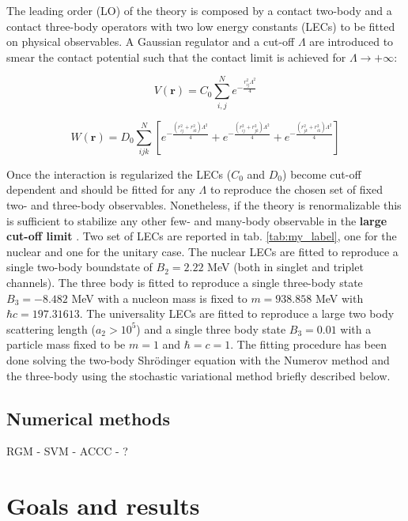 \documentclass[aps,onecolumn,preprintnumbers,amsmath,amssymb,nofootinbib,superscriptaddress,notitlepage]{revtex4-1}
\begin{document}
The leading order (LO) of the theory is composed by a contact two-body and a contact three-body operators with two low energy constants (LECs) to be fitted on physical observables. 
A Gaussian regulator and a cut-off $\Lambda$ are introduced to smear the contact potential such that the contact limit is achieved for $\Lambda\rightarrow+\infty$: 

\begin{equation}
    V(\textbf{r})=C_0 \sum_{i,j}^N e^{-\frac{r_{ij}^2\Lambda^2}{4}}
\end{equation}

\begin{equation}
    W(\textbf{r})=D_0 \sum_{ijk}^N \left[
    e^{-\frac{(r_{ij}^2+r_{ik}^2)\Lambda^2}{4}}+
    e^{-\frac{(r_{ij}^2+r_{jk}^2)\Lambda^2}{4}}+
    e^{-\frac{(r_{jk}^2+r_{ik}^2)\Lambda^2}{4}}\right]
\end{equation}

Once the interaction is regularized the LECs ($C_0$ and $D_0$) become cut-off dependent and should be fitted for any $\Lambda$ to reproduce the chosen set of fixed two- and three-body observables.
Nonetheless, if the theory is renormalizable this is sufficient to stabilize any other few- and many-body observable in the \textbf{large cut-off limit} .
Two set of LECs are reported in tab. \ref{tab:my_label}, one for the nuclear and one for the unitary case.
The nuclear LECs are fitted to reproduce a single two-body boundstate of $B_2=2.22$ MeV (both in singlet and triplet channels).
The three body is fitted to reproduce a single three-body state $B_3=-8.482$ MeV with a nucleon mass is fixed to $m=938.858$ MeV with $\hbar c= 197.31613$.
The universality LECs are fitted to reproduce a large two body scattering length ($a_2>10^5$) and a single three body state $B_3=0.01$ with a particle mass fixed to be $m=1$ and $\hbar=c=1$.
The fitting procedure has been done solving the two-body Shr\"odinger equation with the Numerov method and the three-body using the stochastic variational method briefly described below.

\subsection{Numerical methods}
RGM - SVM - ACCC - ?






\section{Goals and results}
\end{document}
